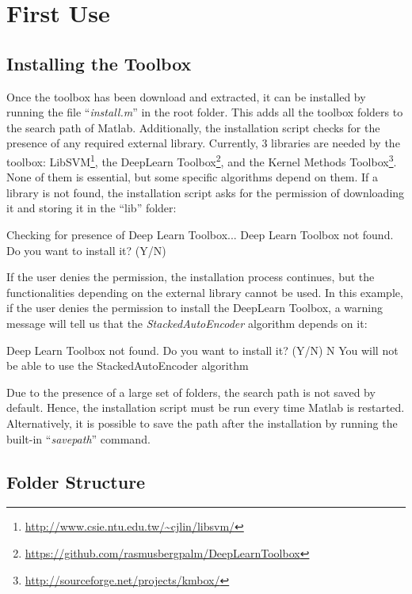 \chapter{First Use}
\label{chap:firstuse}
 
\section{Installing the Toolbox}
\label{sec:installation}

Once the toolbox has been download and extracted, it can be installed by running the file ``\textit{install.m}'' in the root folder. This adds all the toolbox folders to the search path of Matlab. Additionally, the installation script checks for the presence of any required external library. Currently, $3$ libraries are needed by the toolbox: LibSVM\footnote{\url{http://www.csie.ntu.edu.tw/~cjlin/libsvm/}}, the DeepLearn Toolbox\footnote{\url{https://github.com/rasmusbergpalm/DeepLearnToolbox}}, and the Kernel Methods Toolbox\footnote{\url{http://sourceforge.net/projects/kmbox/}}. None of them is essential, but some specific algorithms depend on them. If a library is not found, the installation script asks for the permission of downloading it and storing it in the ``lib'' folder:

\begin{console}
Checking for presence of Deep Learn Toolbox...
Deep Learn Toolbox not found. Do you want to install it? (Y/N) 
\end{console}

\noindent If the user denies the permission, the installation process continues, but the functionalities depending on the external library cannot be used. In this example, if the user denies the permission to install the DeepLearn Toolbox, a warning message will tell us that the \textit{StackedAutoEncoder} algorithm depends on it:
 
\begin{console}
Deep Learn Toolbox not found. Do you want to install it? (Y/N) N
You will not be able to use the StackedAutoEncoder algorithm
\end{console}
 
\noindent Due to the presence of a large set of folders, the search path is not saved by default. Hence, the installation script must be run every time Matlab is restarted. Alternatively, it is possible to save the path after the installation by running the built-in ``\textit{savepath}'' command. 

\section{Folder Structure}
\label{sec:folders}

